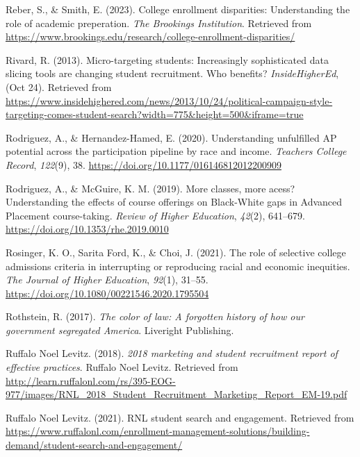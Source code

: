 \documentclass[
  12pt,
]{article}
\newlength{\cslhangindent}
\newlength{\cslentryspacingunit} %
\newenvironment{CSLReferences}[2] %
 {%
  \setlength{\parindent}{0pt}
  \ifodd #1
  \let\oldpar\par
  \def\par{\hangindent=\cslhangindent\oldpar}
  \fi
  \setlength{\parskip}{#2\cslentryspacingunit}
 }%
 {}
\begin{document}
\begin{CSLReferences}{1}{0}
\leavevmode{}%
Reber, S., \& Smith, E. (2023). College enrollment disparities: Understanding the role of academic preperation. \emph{The Brookings Institution}. Retrieved from \url{https://www.brookings.edu/research/college-enrollment-disparities/}

\leavevmode{}%
Rivard, R. (2013). Micro-targeting students: Increasingly sophisticated data slicing tools are changing student recruitment. Who benefits? \emph{InsideHigherEd}, (Oct 24). Retrieved from \url{https://www.insidehighered.com/news/2013/10/24/political-campaign-style-targeting-comes-student-search?width=775\&height=500\&iframe=true}

\leavevmode{}%
Rodriguez, A., \& Hernandez-Hamed, E. (2020). Understanding unfulfilled AP potential across the participation pipeline by race and income. \emph{Teachers College Record}, \emph{122}(9), 38. \url{https://doi.org/10.1177/016146812012200909}

\leavevmode{}%
Rodriguez, A., \& McGuire, K. M. (2019). More classes, more acess? Understanding the effects of course offerings on {Black-White} gaps in {Advanced Placement} course-taking. \emph{Review of Higher Education}, \emph{42}(2), 641--679. \url{https://doi.org/10.1353/rhe.2019.0010}

\leavevmode{}%
Rosinger, K. O., Sarita Ford, K., \& Choi, J. (2021). The role of selective college admissions criteria in interrupting or reproducing racial and economic inequities. \emph{The Journal of Higher Education}, \emph{92}(1), 31--55. \url{https://doi.org/10.1080/00221546.2020.1795504}

\leavevmode{}%
Rothstein, R. (2017). \emph{The color of law: {A} forgotten history of how our government segregated {America}}. Liveright Publishing.

\leavevmode{}%
Ruffalo Noel Levitz. (2018). \emph{2018 marketing and student recruitment report of effective practices}. {Ruffalo Noel Levitz}. Retrieved from \url{http://learn.ruffalonl.com/rs/395-EOG-977/images/RNL_2018_Student_Recruitment_Marketing_Report_EM-19.pdf}

\leavevmode{}%
Ruffalo Noel Levitz. (2021). RNL student search and engagement. Retrieved from \url{https://www.ruffalonl.com/enrollment-management-solutions/building-demand/student-search-and-engagement/}


\end{CSLReferences}
\end{document}
